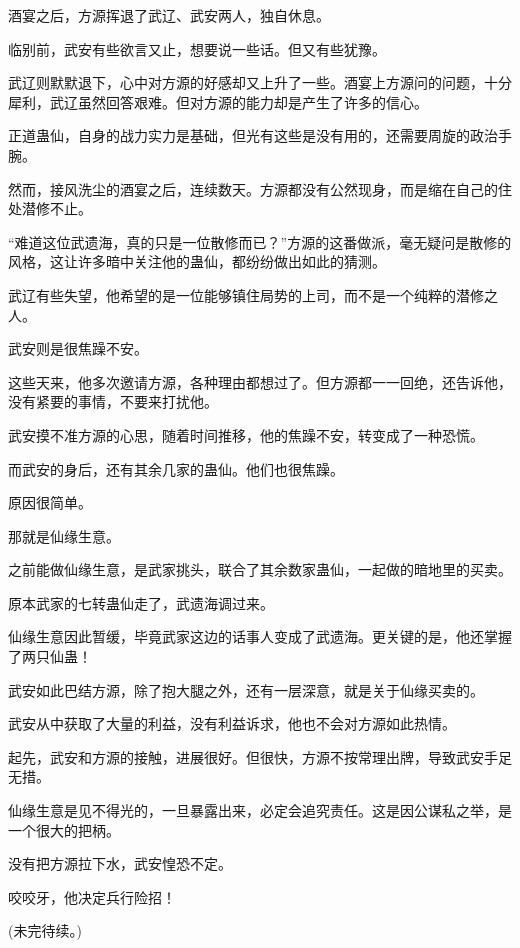 \begin{this_body}
酒宴之后，方源挥退了武辽、武安两人，独自休息。

临别前，武安有些欲言又止，想要说一些话。但又有些犹豫。

武辽则默默退下，心中对方源的好感却又上升了一些。酒宴上方源问的问题，十分犀利，武辽虽然回答艰难。但对方源的能力却是产生了许多的信心。

正道蛊仙，自身的战力实力是基础，但光有这些是没有用的，还需要周旋的政治手腕。

然而，接风洗尘的酒宴之后，连续数天。方源都没有公然现身，而是缩在自己的住处潜修不止。

“难道这位武遗海，真的只是一位散修而已？”方源的这番做派，毫无疑问是散修的风格，这让许多暗中关注他的蛊仙，都纷纷做出如此的猜测。

武辽有些失望，他希望的是一位能够镇住局势的上司，而不是一个纯粹的潜修之人。

武安则是很焦躁不安。

这些天来，他多次邀请方源，各种理由都想过了。但方源都一一回绝，还告诉他，没有紧要的事情，不要来打扰他。

武安摸不准方源的心思，随着时间推移，他的焦躁不安，转变成了一种恐慌。

而武安的身后，还有其余几家的蛊仙。他们也很焦躁。

原因很简单。

那就是仙缘生意。

之前能做仙缘生意，是武家挑头，联合了其余数家蛊仙，一起做的暗地里的买卖。

原本武家的七转蛊仙走了，武遗海调过来。

仙缘生意因此暂缓，毕竟武家这边的话事人变成了武遗海。更关键的是，他还掌握了两只仙蛊！

武安如此巴结方源，除了抱大腿之外，还有一层深意，就是关于仙缘买卖的。

武安从中获取了大量的利益，没有利益诉求，他也不会对方源如此热情。

起先，武安和方源的接触，进展很好。但很快，方源不按常理出牌，导致武安手足无措。

仙缘生意是见不得光的，一旦暴露出来，必定会追究责任。这是因公谋私之举，是一个很大的把柄。

没有把方源拉下水，武安惶恐不定。

咬咬牙，他决定兵行险招！

(未完待续。)

\end{this_body}


